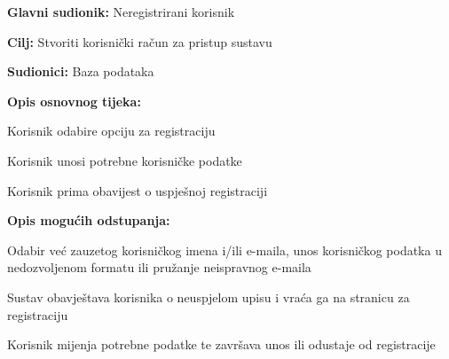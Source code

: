 \noindent {}
					\begin{packed_item}
	
						\item \textbf{Glavni sudionik: }Neregistrirani korisnik
						\item  \textbf{Cilj:} Stvoriti korisnički račun za pristup sustavu
						\item  \textbf{Sudionici:} Baza podataka
						\item  \textbf{Opis osnovnog tijeka:						
						}
						
						\item[] \begin{packed_enum}
	
							\item Korisnik odabire opciju za registraciju
							\item Korisnik unosi potrebne korisničke podatke
							\item Korisnik prima obavijest o uspješnoj registraciji
							
						\end{packed_enum}
						
						\item  \textbf{Opis mogućih odstupanja:}
						
						\item[] \begin{packed_item}
	
							\item[4.a] Odabir već zauzetog korisničkog imena i/ili e-maila, unos 
korisničkog podatka u nedozvoljenom formatu ili pružanje 
neispravnog e-maila

							\item[] \begin{packed_enum}
								
								\item Sustav obavještava korisnika o neuspjelom upisu i vraća 
ga na stranicu za registraciju
								\item Korisnik mijenja potrebne podatke te završava unos ili 
odustaje od registracije
																
							\end{packed_enum}
														
						\end{packed_item}
					\end{packed_item}
					
